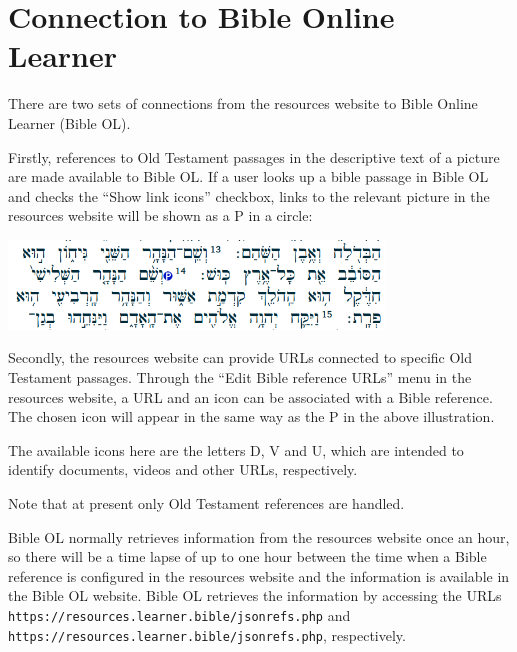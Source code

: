 \documentclass[11pt,oneside,a4paper,article]{memoir}
\begin{document}
\chapter{Connection to Bible Online Learner}

There are two sets of connections from the resources website to Bible Online Learner (Bible OL).

Firstly, references to Old Testament passages in the descriptive text of a picture are made available to Bible
OL. If a user looks up a bible passage in Bible OL and checks the ``Show link icons'' checkbox,
links to the relevant picture in the resources website will be shown as a P in a circle:

\begin{center}
\includegraphics[width=10cm]{picture_link.png}
\end{center}

Secondly, the resources website can provide URLs connected to specific Old Testament passages.
Through the ``Edit Bible reference URLs'' menu in the resources website, a URL and an icon can be
associated with a Bible reference. The chosen icon will appear in the same way as the P in the above
illustration.

The available icons here are the letters D, V and U, which are intended to identify documents,
videos and other URLs, respectively.

Note that at present only Old Testament references are handled.

Bible OL normally retrieves information from the resources website once an hour, so there will be a
time lapse of up to one hour between the time when a Bible reference is configured in the resources
website and the information is available in the Bible OL website. Bible OL retrieves the information
by accessing the URLs \texttt{https://resources.learner.bible/jsonrefs.php} and
\texttt{https://resources.learner.bible/jsonrefs.php}, respectively.
\end{document}
